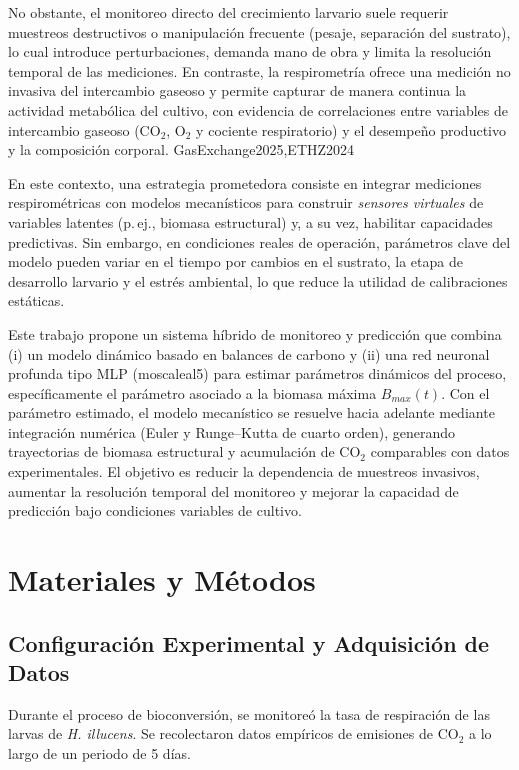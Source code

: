 \documentclass[11pt,a4paper]{article}
\begin{document}
No obstante, el monitoreo directo del crecimiento larvario suele requerir muestreos destructivos o manipulación frecuente (pesaje, separación del sustrato), lo cual introduce perturbaciones, demanda mano de obra y limita la resolución temporal de las mediciones. En contraste, la respirometría ofrece una medición no invasiva del intercambio gaseoso y permite capturar de manera continua la actividad metabólica del cultivo, con evidencia de correlaciones entre variables de intercambio gaseoso (CO$_2$, O$_2$ y cociente respiratorio) y el desempeño productivo y la composición corporal. GasExchange2025,ETHZ2024

En este contexto, una estrategia prometedora consiste en integrar mediciones respirométricas con modelos mecanísticos para construir \textit{sensores virtuales} de variables latentes (p.\,ej., biomasa estructural) y, a su vez, habilitar capacidades predictivas. Sin embargo, en condiciones reales de operación, parámetros clave del modelo pueden variar en el tiempo por cambios en el sustrato, la etapa de desarrollo larvario y el estrés ambiental, lo que reduce la utilidad de calibraciones estáticas. \cite{eriksenDynamicModellingFeed2022}

Este trabajo propone un sistema híbrido de monitoreo y predicción que combina (i) un modelo dinámico basado en balances de carbono y (ii) una red neuronal profunda tipo MLP (moscaleal5) para estimar parámetros dinámicos del proceso, específicamente el parámetro asociado a la biomasa máxima $B_{max}(t)$. Con el parámetro estimado, el modelo mecanístico se resuelve hacia adelante mediante integración numérica (Euler y Runge--Kutta de cuarto orden), generando trayectorias de biomasa estructural y acumulación de CO$_2$ comparables con datos experimentales. El objetivo es reducir la dependencia de muestreos invasivos, aumentar la resolución temporal del monitoreo y mejorar la capacidad de predicción bajo condiciones variables de cultivo.

\section{Materiales y Métodos}

\subsection{Configuración Experimental y Adquisición de Datos}
Durante el proceso de bioconversión, se monitoreó la tasa de respiración de las larvas de \textit{H. illucens}. Se recolectaron datos empíricos de emisiones de CO$_2$ a lo largo de un periodo de 5 días. \cite{adadiPeekingBlackBoxSurvey2018}
\end{document}
